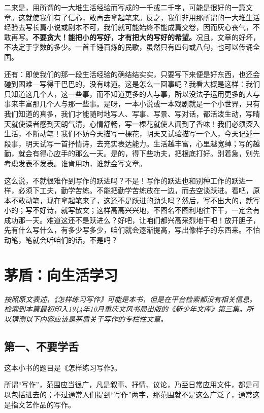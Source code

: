 \documentclass[fontset=fandol,12pt,a5paper]{ctexbook}
\begin{document}
二来是，用所谓的一大堆生活经验而写成的一千或二千字，可能是很好的一篇文章。这就使我们有了信心，敢再去拿起笔来。反之，我们非用那所谓的一大堆生活经验去写长篇小说或剧本不可，我们就可能始终不能成篇交卷，因而灰心丧气，不敢再写。\textbf{不要贪大！能把小的写好，才有把大的写好的希望。}况且，文章的好坏，不决定于字数的多少。一首千锤百炼的民歌，虽然只有四句或八句，也可以传诵全国。

还有：即使我们的那一段生活经验的确结结实实，只要写下来便是好东西，也还会碰到困难—写得干巴巴的，没有味道。这是怎么一回事呢？我看大概是这样：我们只知道这几个人，这一些事，而不知道更多的人与事，所以没法子运用更多的人与事来丰富那几个人与那一些事。是呀，一本小说或一本戏剧就是一个小世界，只有我们知道的真多，我们才能随时地写人、写事、写景、写对话，都活泼生动，写晴天就使读者感到天朗气清，心情舒畅，写一棵花就使人闻到了香味！我们必须深入生活，不断动笔！我们不妨今天描写一棵花，明天又试验描写一个人，今天记述一段事，明天试写一首抒情诗，去充实表达能力。生活越丰富，心里越宽绰；写的越勤，就会有得心应手的那么一天。是的，得下些功夫，把根底打好。别着急，别先考虑发表不发表。谁肯用功，谁就会写文章。

这么说，不就很难作到写作的跃进吗？不是！写作的跃进也和别种工作的跃进一样，必须下工夫，勤学苦练。不能把勤学苦练放在一边，而去空谈跃进。看吧，原本不敢动笔，现在拿起笔来了，这还不是跃进的劲头吗？然后，写不出大的，就写小的；写不好诗，就写散文；这样高高兴兴地，不图名不图利地往下干，一定会有成功那一天。难道这还不是跃进么？好吧，让咱们都兴高采烈地干吧！放开胆子，先有什么写什么，有多少写多少，咱们就会逐渐提高，写出像样子的东西来。不怕动笔，笔就会听咱们的话，不是吗？

\newpage

\section{茅盾：向生活学习}

\emph{按照原文表述，《怎样练习写作》可能是本书，但是在平台检索都没有相关信息。检索到本篇最初印入1944年10月重庆文风书局出版的《新少年文库》第三集。所以猜测以下内容应该是茅盾关于写作的专栏性文章。}
\vspace{2em}

\subsection{第一、不要学舌}
这本小书的题目是《怎样练习写作》。

所谓“写作”，范围应当很广，凡是叙事、抒情、议论，乃至日常应用文件，都是可以包括进去的；不过通常人们提到“写作”两字，那范围就不是这么广泛了，通常这是指文艺作品的写作。
\end{document}
